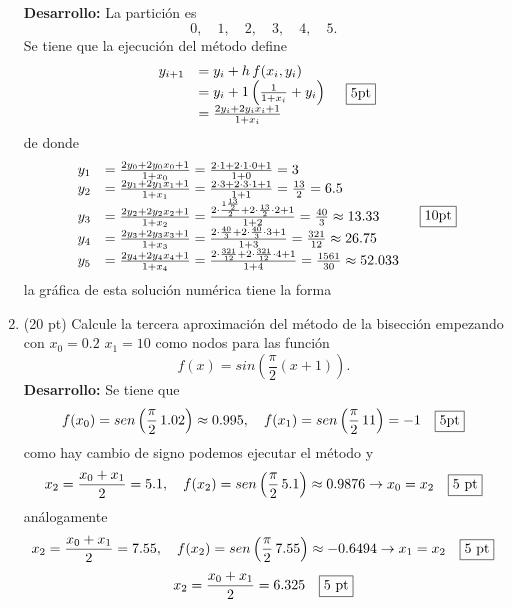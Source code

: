 \documentclass[11pt]{article}
\begin{document}
\begin{enumerate}
\textbf{Desarrollo:} La partici\'on es 
$$
0, \quad 1, \quad 2, \quad 3, \quad 4, \quad 5.
$$
Se tiene que la ejecuci\'on del m\'etodo define
$$
\begin{array}{cl}
y_{i+1}	&=y_i+h\, f(x_i,y_i)\\
		&=y_i+1\left( \frac{1}{1+x_i}+y_i\right)\\
        &=\frac{2y_i+2y_ix_i+1}{1+x_i}
\end{array}\quad \fbox{5pt}
$$
de donde
$$
\begin{array}{cl}
y_1	&=\frac{2y_0+2y_0x_0+1}{1+x_0}=\frac{2 \cdot 1+2\cdot 1 \cdot 0+1}{1+0}=3 				\\
y_2	&=\frac{2y_1+2y_1x_1+1}{1+x_1}=\frac{2 \cdot 3+2\cdot 3 \cdot 1+1}{1+1}=\frac{13}{2}=6.5 	\\
y_3	&=\frac{2y_2+2y_2x_2+1}{1+x_2}=\frac{2 \cdot \frac{1\frac{13}{2}}{2}+2\cdot \frac{13}{2} \cdot 2+1}{1+2}=\frac{40}{3} \approx 13.33 	\\
y_4	&=\frac{2y_3+2y_3x_3+1}{1+x_3}=\frac{2 \cdot \frac{40}{3}+2\cdot \frac{40}{3} \cdot 3+1}{1+3}=\frac{321}{12} \approx 26.75	\\
y_5	&=\frac{2y_4+2y_4x_4+1}{1+x_4}=\frac{2 \cdot\frac{321}{12}+2\cdot \frac{321}{12}  \cdot 4+1}{1+4}=\frac{1561}{30}\approx 52.033
\end{array} \quad \fbox{10pt}
$$
la gr\'afica de esta soluci\'on num\'erica tiene la forma
 \begin{center}
        \end{center}

\item  (20 pt) Calcule la tercera aproximaci\'on del m\'etodo de la bisecci\'on empezando con $x_0=0.2$ $x_1=10$ como nodos para las funci\'on
$$f(x)=sin\left(\frac{\pi}{2} (x+1)\right).$$
\textbf{Desarrollo:} Se tiene que
$$
f(x_0)=sen\left(\frac{\pi}{2}\, 1.02\right)\approx 0.995, \quad 
f(x_1)=sen\left(\frac{\pi}{2}\, 11  \right)=-1  \quad \fbox{5pt}
$$
como hay cambio de signo podemos ejecutar el m\'etodo y
$$
x_2=\frac{x_0+x_1}{2}=5.1,\quad f(x_2)=sen\left(\frac{\pi}{2}\, 5.1\right) \approx 0.9876 \rightarrow x_0=x_2 \quad \fbox{5 pt}
$$
an\'alogamente 
$$
x_2=\frac{x_0+x_1}{2}=7.55,\quad f(x_2)=sen\left(\frac{\pi}{2}\, 7.55\right) \approx -0.6494 \rightarrow x_1=x_2 \quad \fbox{5 pt}
$$
$$
x_2=\frac{x_0+x_1}{2}=6.325 \quad \fbox{5 pt}
$$
\end{enumerate}
\end{document}
